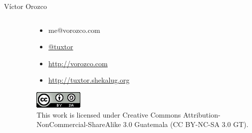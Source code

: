 \documentclass[aspectratio=169]{beamer}
\begin{document}
\begin{frame}{Víctor Orozco}
\begin{columns}[T]
\begin{column}[T]{4cm}
\begin{figure}
            \end{figure}
        \end{column}
        \begin{column}[T]{6cm} %
            \begin{itemize}
                \item me@vorozco.com
                \item \href{https://twitter.com/tuxtor}{@tuxtor}
                \item \href{http://vorozco.com}{http://vorozco.com}
                \item \href{http://tuxtor.shekalug.org}{http://tuxtor.shekalug.org}
            \end{itemize}
            \begin{center}
                \includegraphics[width=0.1\linewidth]{Images/cclogo}
                \\
                This work is licensed under Creative Commons Attribution-NonCommercial-ShareAlike 3.0 Guatemala (CC BY-NC-SA 3.0 GT).
            \end{center}
        \end{column}
    \end{columns}
\end{frame}
\end{document}

